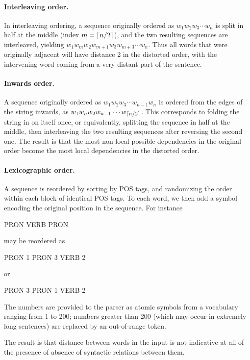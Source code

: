 \documentclass[10pt,twoside,lineno]{article}
\DeclarePairedDelimiter{\ceiling}{\lceil}{\rceil}
\begin{document}
\paragraph{Interleaving order.} In interleaving ordering, a sequence originally ordered as $w_1 w_2 w_3 \cdots w_n$ is split in half at the middle (index $m=\ceiling{n/2}$), and the two resulting sequences are interleaved, yielding $w_1 w_m w_2 w_{m+1} w_3 w_{m+3} \cdots w_n$. Thus all words that were originally adjacent will have distance 2 in the distorted order, with the intervening word coming from a very distant part of the sentence.

\paragraph{Inwards order.} A sequence originally ordered as $w_1 w_2 w_3 \cdots w_{n-1} w_n$ is ordered from the edges of the string inwards, as $w_1 w_n w_2 w_{n-1} \cdots w_{\ceiling{n/2}}$. This corresponds to folding the string in on itself once, or equivalently, splitting the sequence in half at the middle, then interleaving the two resulting sequences after reversing the second one. The result is that the most non-local possible dependencies in the original order become the most local dependencies in the distorted order.

\paragraph{Lexicographic order.} A sequence is reordered by sorting by POS tags, and randomizing the order within each block of identical POS tags.
To each word, we then add a symbol encoding the original position in the sequence.
For instance
\begin{center}
PRON VERB PRON
\end{center}
may be reordered as
\begin{center}
PRON 1 PRON 3 VERB 2
\end{center}
or
\begin{center}
PRON 3 PRON 1 VERB 2
\end{center}
The numbers are provided to the parser as atomic symbols from a vocabulary ranging from 1 to 200; numbers greater than 200 (which may occur in extremely long sentences) are replaced by an out-of-range token.

The result is that distance between words in the input is not indicative at all of the presence of absence of syntactic relations between them.
\end{document}
